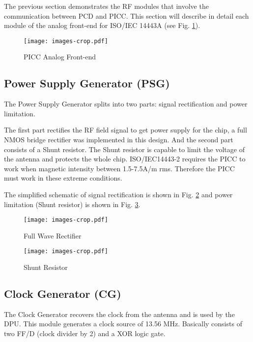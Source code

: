 The previous section demonstrates the RF modules that involve  the communication between PCD and PICC. This section will describe in detail each module of the analog front-end for ISO/IEC 14443A (see Fig. \ref{fig:afe}).

\begin{figure}[]
  \centering
  \texttt{[image: images-crop.pdf]}
  \caption{PICC Analog Front-end}
  \label{fig:afe}
\end{figure}

\subsection{Power Supply Generator (PSG)}

The Power Supply Generator splits into two parts: signal rectification and power limitation.

The first part rectifies the RF field signal to get power supply for the chip, a full NMOS bridge rectifier \cite{rfid_rect1}\cite{rfid_rect2} was implemented in this design. And the second part consists of a Shunt resistor. The Shunt resistor is capable to limit the voltage of the antenna and protects the whole chip. ISO/IEC14443-2 requires the PICC to work when magnetic intensity between 1.5-7.5A/m rms. Therefore the PICC must work in these extreme conditions.  

The simplified schematic of signal rectification is shown in Fig. \ref{fig:rect} and power limitation (Shunt resistor) is shown in Fig. \ref{fig:shunt}.

\begin{figure}[h]
  \centering
  \texttt{[image: images-crop.pdf]}
  \caption{Full Wave Rectifier}
  \label{fig:rect}
\end{figure}

\begin{figure}[h]
  \centering
  \texttt{[image: images-crop.pdf]}
  \caption{Shunt Resistor}
  \label{fig:shunt}
\end{figure}

\subsection{Clock Generator (CG)}

The Clock Generator recovers the clock from the antenna and is used by the DPU. This module generates a clock source of 13.56 MHz. Basically consists of two FF/D (clock divider by 2) and a XOR logic gate. 


